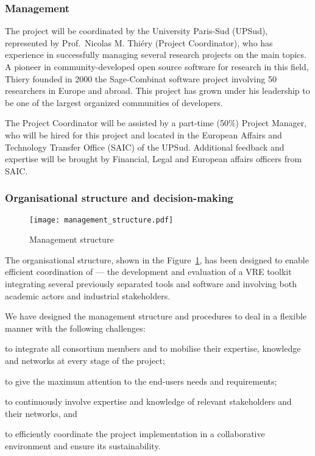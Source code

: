 \label{sect:mgt}

\subsubsection{Management}

The project will be coordinated by the University Paris-Sud (UPSud),
represented by Prof.~Nicolas M. Thiéry (Project Coordinator), who has
experience in successfully managing several research projects on the
main \TheProject topics.  A pioneer in community-developed open source
software for research in this field, Thiery founded in 2000 the
Sage-Combinat software project involving 50 researchers in Europe and
abroad.  This project has grown under his leadership to be one of the
largest organized communities of \Sage developers.

The Project Coordinator will be assisted by a part-time (50\%) Project
Manager, who will be hired for this project and located in the
European Affairs and Technology Transfer Office (SAIC) of the UPSud.
Additional feedback and expertise will be brought by Financial, Legal
and European affairs officers from SAIC.

\subsubsection{Organisational structure and decision-making}


\begin{figure}
  \centering
  \texttt{[image: management\_structure.pdf]}
  \caption{Management structure}
  \label{figure.management}
\end{figure}

The organisational structure, shown in the Figure~\ref{figure.management}, has been designed
to enable efficient coordination of \TheProject --- the
development and evaluation of a VRE toolkit
integrating several previously separated tools and software and
involving both academic actors and industrial stakeholders.

We have designed the management structure and procedures to deal in a
flexible manner with the following challenges:

\begin{compactitem}
\item to integrate all consortium members and to mobilise their
  expertise, knowledge and networks at every stage of the project;
\item to give the maximum attention to the end-users needs and
  requirements;
\item to continuously involve expertise and knowledge of relevant
  stakeholders and their networks, and
\item to efficiently coordinate the project implementation in a
  collaborative environment and ensure its sustainability.
\end{compactitem}

